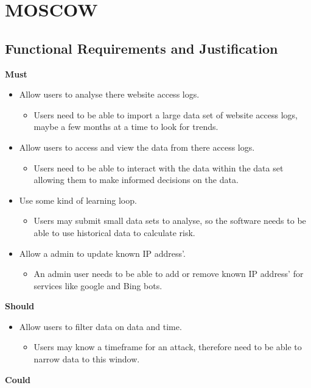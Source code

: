 
\section{MOSCOW} \label{Moscow}
\subsection{Functional Requirements and Justification}
\textbf{Must}
\begin{itemize}
    \item Allow users to analyse there website access logs.
    \begin{itemize}
        \item Users need to be able to import a large data set of website access logs, maybe a few months at a time to look for trends.
    \end{itemize}
    \item Allow users to access and view the data from there access logs.
    \begin{itemize}
        \item Users need to be able to interact with the data within the data set allowing them to make informed decisions on the data.
    \end{itemize}
    \item Use some kind of learning loop.
    \begin{itemize}
        \item Users may submit small data sets to analyse, so the software needs to be able to use historical data to calculate risk.
    \end{itemize}
    \item Allow a admin to update known IP address'.
    \begin{itemize}
        \item An admin user needs to be able to add or remove known IP address' for services like google and Bing bots.
    \end{itemize}
\end{itemize}
\textbf{Should}
\begin{itemize}
    \item Allow users to filter data on data and time.
    \begin{itemize}
        \item Users may know a timeframe for an attack, therefore need to be able to narrow data to this window.
    \end{itemize}
\end{itemize}
\textbf{Could}

